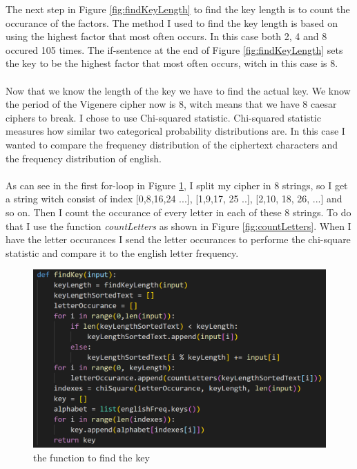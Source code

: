 \documentclass[12pt, letterpaper]{article}
\begin{document}
The next step in Figure \ref{fig:findKeyLength} to find the key length is to count the occurance of the factors. The method I used to find the key length is based on using the highest factor that most often occurs. In this case both 2, 4 and 8 occured 105 times. The if-sentence at the end of Figure \ref{fig:findKeyLength} sets the key to be the highest factor that most often occurs, witch in this case is 8.
\\ \\
Now that we know the length of the key we have to find the actual key. We know the period of the Vigenere cipher now is 8, witch means that we have 8 caesar ciphers to break. I chose to use Chi-squared statistic. Chi-squared statistic measures how similar two categorical probability distributions are. In this case I wanted to compare the frequency distribution of the ciphertext characters and the frequency distribution of english.
\\ \\
As can see in the first for-loop in Figure \ref{fig:findKey}, I split my cipher in 8 strings, so I get a string witch consist of index [0,8,16,24 ...], [1,9,17, 25 ..], [2,10, 18, 26, ...] and so on. Then I count the occurance of every letter in each of these 8 strings. To do that I use the function \textit{countLetters} as shown in Figure \ref{fig:countLetters}. When I have the letter occurances I send the letter occurances to performe the chi-square statistic and compare it to the english letter frequency.

\begin{figure}[H]
  \includegraphics[width=\linewidth]{code_snippets/findKey.PNG}
  \caption{the function to find the key}
  \label{fig:findKey}
\end{figure}
\end{document}
